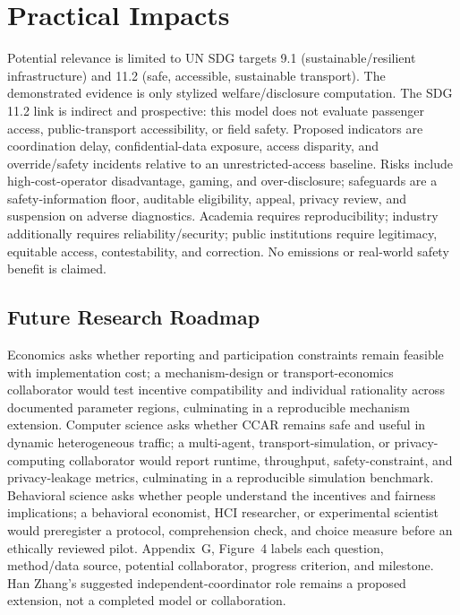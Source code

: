 \section{Practical Impacts}
Potential relevance is limited to UN SDG targets 9.1 (sustainable/resilient infrastructure) and 11.2 (safe, accessible, sustainable transport). The demonstrated evidence is only stylized welfare/disclosure computation. The SDG 11.2 link is indirect and prospective: this model does not evaluate passenger access, public-transport accessibility, or field safety. Proposed indicators are coordination delay, confidential-data exposure, access disparity, and override/safety incidents relative to an unrestricted-access baseline. Risks include high-cost-operator disadvantage, gaming, and over-disclosure; safeguards are a safety-information floor, auditable eligibility, appeal, privacy review, and suspension on adverse diagnostics. Academia requires reproducibility; industry additionally requires reliability/security; public institutions require legitimacy, equitable access, contestability, and correction. No emissions or real-world safety benefit is claimed.

\subsection*{Future Research Roadmap}
Economics asks whether reporting and participation constraints remain feasible with implementation cost; a mechanism-design or transport-economics collaborator would test incentive compatibility and individual rationality across documented parameter regions, culminating in a reproducible mechanism extension. Computer science asks whether CCAR remains safe and useful in dynamic heterogeneous traffic; a multi-agent, transport-simulation, or privacy-computing collaborator would report runtime, throughput, safety-constraint, and privacy-leakage metrics, culminating in a reproducible simulation benchmark. Behavioral science asks whether people understand the incentives and fairness implications; a behavioral economist, HCI researcher, or experimental scientist would preregister a protocol, comprehension check, and choice measure before an ethically reviewed pilot. Appendix~G, Figure~4 labels each question, method/data source, potential collaborator, progress criterion, and milestone. Han Zhang's suggested independent-coordinator role remains a proposed extension, not a completed model or collaboration.

